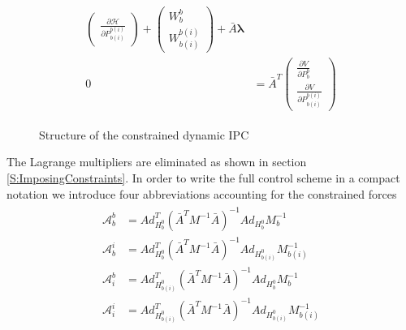 \documentclass[a4paper,twoside, openright,12pt]{report}
\begin{document}
{\begin{eqnarray}
\begin{aligned}
\begin{pmatrix}
\frac{\partial \mathcal{H}}{\partial P_{b(i)}^{b(i)}}
\end{pmatrix}
+
\begin{pmatrix}
W_b^b \\ W_{b(i)}^{b(i)}
\end{pmatrix}
+
\bar{A}\boldsymbol{\lambda} 
\\
0 
&=
\bar{A}^T 
\begin{pmatrix} \frac{\partial V}{\partial P_b^b} \\ 
\frac{\partial V}{\partial P_{b(i)}^{b(i)}}
\end{pmatrix}
\end{aligned}
\end{eqnarray}
\begin{figure}[b]
	\centering
	\small
	\def\svgwidth{0.8\columnwidth}
	
	\caption{Structure of the constrained dynamic IPC}
	\label{FIG:admittancecontrol}
\end{figure}
The Lagrange multipliers are eliminated as shown in section \ref{S:ImposingConstraints}. In order to write the full control scheme in a compact notation we introduce four abbreviations accounting for the constrained forces
\begin{eqnarray}
\begin{aligned}
\mathcal{A}_b^b &= 
Ad_{H_b^0}^T(\bar{A}^TM^{-1}\bar{A})^{-1} Ad_{H_b^0}M_b^{-1} \\
\mathcal{A}_b^i &= Ad_{H_b^0}^T(\bar{A}^TM^{-1}\bar{A})^{-1} Ad_{H_{b(i)}^0}M_{b(i)}^{-1} \\
\mathcal{A}_i^b &= Ad_{H_{b(i)}^0}^T(\bar{A}^TM^{-1}\bar{A})^{-1} Ad_{H_b^0}M_b^{-1} \\
\mathcal{A}_i^i &= 
Ad_{H_{b(i)}^0}^T(\bar{A}^TM^{-1}\bar{A})^{-1} Ad_{H_{b(i)}^0}M_{b(i)}^{-1}
\end{aligned}
\end{eqnarray}





}
\end{document}
